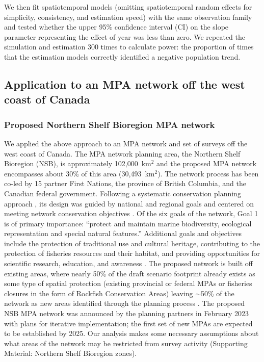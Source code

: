 \documentclass[12pt]{article}
\begin{document}
\begin{spacing}{1.4}
We then fit spatiotemporal models (omitting spatiotemporal random effects for simplicity, consistency, and estimation speed) with the same observation family and tested whether the upper 95\% confidence interval (CI) on the slope parameter representing the effect of year was less than zero.
We repeated the simulation and estimation 300 times to calculate power: the proportion of times that the estimation models correctly identified a negative population trend.

\subsection*{Application to an MPA network off the west coast of Canada}

\subsubsection*{Proposed Northern Shelf Bioregion MPA network}

We applied the above approach to an MPA network and set of surveys off the west coast of Canada.
The MPA network planning area, the Northern Shelf Bioregion (NSB), is approximately 102,000~km$^2$ and the proposed MPA network encompasses about 30\% of this area (30,493~km$^2$).
The network process has been co-led by 15 partner First Nations, the province of British Columbia, and the Canadian federal government.
Following a systematic conservation planning approach \citep{margules2000}, its design was guided by national and regional goals \citep{canada2011, canada2014} and centered on meeting network conservation objectives \citep{dfo2022networkactionplan}.
Of the six goals of the network, Goal 1 is of primary importance: ``protect and maintain marine biodiversity, ecological representation and special natural features.''
Additional goals and objectives include the protection of traditional use and cultural heritage, contributing to the protection of fisheries resources and their habitat, and providing opportunities for scientific research, education, and awareness \citep{canada2014}.
The proposed network is built off existing areas, where nearly 50\% of the draft scenario footprint already exists as some type of spatial protection (existing provincial or federal MPAs or fisheries closures in the form of Rockfish Conservation Areas) leaving $\sim$50\% of the network as new areas identified through the planning process \citep{dfo2022networkactionplan}.
The proposed NSB MPA network was announced by the planning partners in February 2023 with plans for iterative implementation; the first set of new MPAs are expected to be established by 2025.
Our analysis makes some necessary assumptions about what areas of the network may be restricted from survey activity (Supporting Material: Northern Shelf Bioregion zones).


\end{spacing}
\end{document}
